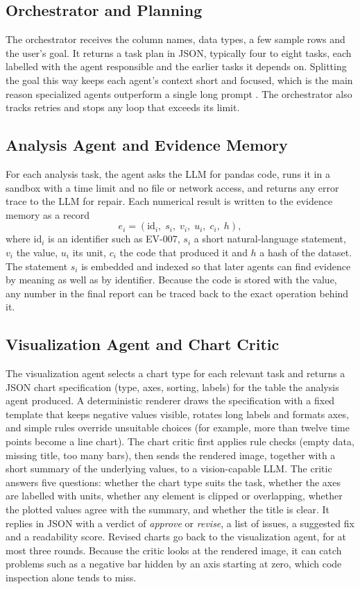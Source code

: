 \documentclass[conference]{IEEEtran}
\begin{document}
\subsection{Orchestrator and Planning}
The orchestrator receives the column names, data types, a few sample rows and the user's goal. It returns a task plan in JSON, typically four to eight tasks, each labelled with the agent responsible and the earlier tasks it depends on. Splitting the goal this way keeps each agent's context short and focused, which is the main reason specialized agents outperform a single long prompt \cite{montazeri2025publicagent}. The orchestrator also tracks retries and stops any loop that exceeds its limit.

\subsection{Analysis Agent and Evidence Memory}
For each analysis task, the agent asks the LLM for pandas code, runs it in a sandbox with a time limit and no file or network access, and returns any error trace to the LLM for repair. Each numerical result is written to the evidence memory as a record
\begin{equation}
e_i = \left(\mathrm{id}_i,\; s_i,\; v_i,\; u_i,\; c_i,\; h\right),
\end{equation}
where $\mathrm{id}_i$ is an identifier such as EV-007, $s_i$ a short natural-language statement, $v_i$ the value, $u_i$ its unit, $c_i$ the code that produced it and $h$ a hash of the dataset. The statement $s_i$ is embedded and indexed so that later agents can find evidence by meaning as well as by identifier. Because the code is stored with the value, any number in the final report can be traced back to the exact operation behind it.

\subsection{Visualization Agent and Chart Critic}
The visualization agent selects a chart type for each relevant task and returns a JSON chart specification (type, axes, sorting, labels) for the table the analysis agent produced. A deterministic renderer draws the specification with a fixed template that keeps negative values visible, rotates long labels and formats axes, and simple rules override unsuitable choices (for example, more than twelve time points become a line chart). The chart critic first applies rule checks (empty data, missing title, too many bars), then sends the rendered image, together with a short summary of the underlying values, to a vision-capable LLM. The critic answers five questions: whether the chart type suits the task, whether the axes are labelled with units, whether any element is clipped or overlapping, whether the plotted values agree with the summary, and whether the title is clear. It replies in JSON with a verdict of \textit{approve} or \textit{revise}, a list of issues, a suggested fix and a readability score. Revised charts go back to the visualization agent, for at most three rounds. Because the critic looks at the rendered image, it can catch problems such as a negative bar hidden by an axis starting at zero, which code inspection alone tends to miss.
\end{document}
